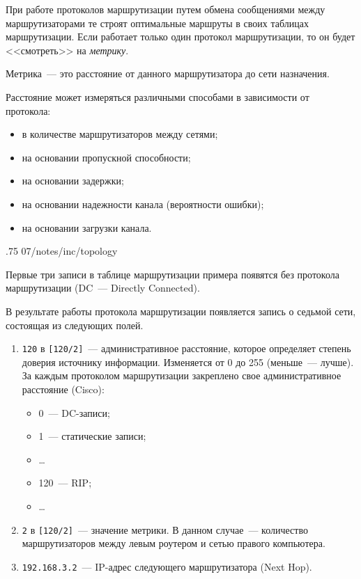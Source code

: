 При работе протоколов маршрутизации путем обмена сообщениями между маршрутизаторами те строят оптимальные маршруты в своих таблицах маршрутизации. Если работает только один протокол маршрутизации, то он будет <<смотреть>> на \textit{метрику}.

\begin{dd}
    Метрика~--- это расстояние от данного маршрутизатора до сети назначения.
\end{dd}

Расстояние может измеряться различными способами в зависимости от протокола:

\begin{itemize}
    \item в количестве маршрутизаторов между сетями;
    \item на основании пропускной способности;
    \item на основании задержки;
    \item на основании надежности канала (вероятности ошибки);
    \item на основании загрузки канала.
\end{itemize}

\image
{.75\textwidth}
{07/notes/inc/topology}
{}

Первые три записи в таблице маршрутизации примера появятся без протокола маршрутизации (DC~--- Directly Connected).

В результате работы протокола маршрутизации появляется запись о седьмой сети, состоящая из следующих полей.

\begin{enumerate}
    \item \texttt{120} в \texttt{[120/2]}~--- административное расстояние, которое определяет степень доверия источнику информации. Изменяется от 0 до 255 (меньше~--- лучше). За каждым протоколом маршрутизации закреплено свое административное расстояние (Cisco):
          \begin{itemize}
              \item 0~--- DC-записи;
              \item 1~--- статические записи;
              \item \dots
              \item 120~--- RIP;
              \item \dots
          \end{itemize}
    \item \texttt{2} в \texttt{[120/2]}~--- значение метрики. В данном случае~--- количество маршрутизаторов между левым роутером и сетью правого компьютера.
    \item \texttt{192.168.3.2}~--- IP-адрес следующего маршрутизатора (Next Hop).
\end{enumerate}

